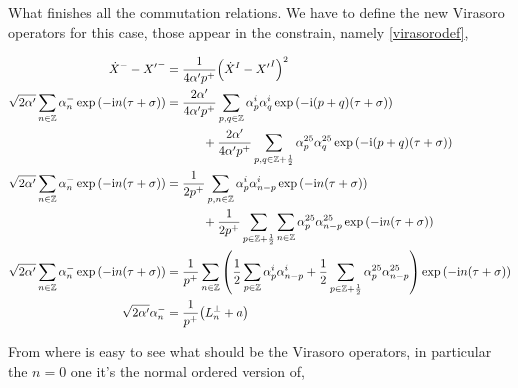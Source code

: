 What finishes all the commutation relations. We have to define the new Virasoro operators for this case, 
those appear in the constrain, namely \ref{virasorodef},

\begin{align*}
    {\dot X}^--{X'}^-&=\frac{1}{4\alpha'{p^+}}\qty({\dot X}^I-{X'}^I)^2\\
    \sqrt{2\alpha'}\sum\limits_{n\in\mathbb Z}\alpha^-_n\exp\qty(-\textnormal{i} n\qty(\tau+\sigma))&=\frac{2\alpha'}{4\alpha' p^+}\sum\limits_{p,q\in\mathbb Z}\alpha^i_p\alpha^i_q\exp\qty(-\textnormal{i}\qty(p+q)\qty(\tau+\sigma))\\
    &\quad\quad\quad+\frac{2\alpha'}{4\alpha' p^+}\sum\limits_{p,q\in\mathbb Z+\frac12}\alpha^{25}_p\alpha^{25}_q\exp\qty(-\textnormal{i}\qty(p+q)\qty(\tau+\sigma))\\
    \sqrt{2\alpha'}\sum\limits_{n\in\mathbb Z}\alpha^-_n\exp\qty(-\textnormal{i} n\qty(\tau+\sigma))&=\frac{1}{2 p^+}\sum\limits_{p,n\in\mathbb Z}\alpha^i_p\alpha^i_{n-p}\exp\qty(-\textnormal{i} n\qty(\tau+\sigma))\\
    &\quad\quad\quad+\frac{1}{2p^+}\sum\limits_{p\in\mathbb Z+\frac12}\sum\limits_{n\in\mathbb Z}\alpha^{25}_p\alpha^{25}_{n-p}\exp\qty(-\textnormal{i} n\qty(\tau+\sigma))\\
    \sqrt{2\alpha'}\sum\limits_{n\in\mathbb Z}\alpha^-_n\exp\qty(-\textnormal{i} n\qty(\tau+\sigma))&=\frac{1}{p^+}\sum\limits_{n\in\mathbb Z}\qty(\frac12\sum\limits_{p\in\mathbb Z}\alpha^i_p\alpha^i_{n-p}+\frac12\sum\limits_{p\in\mathbb Z+\frac12}\alpha^{25}_p\alpha^{25}_{n-p})\exp\qty(-\textnormal{i} n\qty(\tau+\sigma))\\
    \sqrt{2\alpha'}\alpha_n^-&=\frac{1}{p^+}\qty(L_n^\perp+a)
\end{align*}

From where is easy to see what should be the Virasoro operators, in particular the $n=0$ one it's the normal ordered version of,

